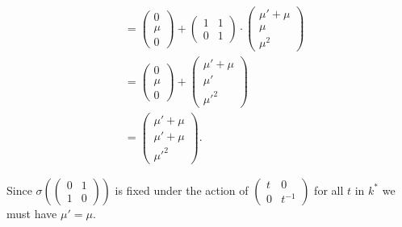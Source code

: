 \begin{align*}
&=
\left(\begin{matrix} 0 \\ \mu \\ 0 \end{matrix}\right)
+
\left(\begin{matrix} 1 & 1 \\ 0 & 1 \end{matrix}\right) \cdot
\left(\begin{matrix} \mu' + \mu \\ \mu \\ \mu^2 \end{matrix}\right)\\
&=
\left(\begin{matrix} 0 \\ \mu \\ 0 \end{matrix}\right)
+
\left(\begin{matrix} \mu' + \mu \\ \mu' \\ \mu'^2 \end{matrix}\right)\\
&=
\left(\begin{matrix} \mu' + \mu \\ \mu' + \mu \\ \mu'^2 \end{matrix}\right).
\end{align*}

Since $\sigma\left(\left(\begin{matrix} 0 & 1 \\ 1 & 0\end{matrix}\right)\right)$ is fixed under the action of $\left(\begin{matrix} t & 0 \\ 0 & t^{-1}\end{matrix}\right)$ for all $t$ in $k^*$ we must have $\mu'=\mu$. 

